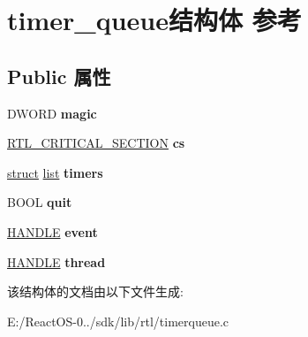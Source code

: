 \hypertarget{structtimer__queue}{}\section{timer\+\_\+queue结构体 参考}
\label{structtimer__queue}
\subsection*{Public 属性}
\begin{DoxyCompactItemize}
\item 
\mbox{\label{structtimer__queue_a9582b5d3e2db4ee2f23240e8dbb1f8ff}} 
D\+W\+O\+RD {\bfseries magic}
\item 
\mbox{\label{structtimer__queue_a01d39587650d02b46ad0f380fa7c8556}} 
\hyperlink{struct___r_t_l___c_r_i_t_i_c_a_l___s_e_c_t_i_o_n}{R\+T\+L\+\_\+\+C\+R\+I\+T\+I\+C\+A\+L\+\_\+\+S\+E\+C\+T\+I\+ON} {\bfseries cs}
\item 
\mbox{\label{structtimer__queue_aebc3c7bc0fabb494e675bae25123bbc4}} 
\hyperlink{interfacestruct}{struct} \hyperlink{classlist}{list} {\bfseries timers}
\item 
\mbox{\label{structtimer__queue_a9d818717bd3d66107c5daf51d48adfb8}} 
B\+O\+OL {\bfseries quit}
\item 
\mbox{\label{structtimer__queue_a01897dcd500704915664fa7f2f7a3e23}} 
\hyperlink{interfacevoid}{H\+A\+N\+D\+LE} {\bfseries event}
\item 
\mbox{\label{structtimer__queue_a3f80726fd82820ea6f91dddc56b0d9ba}} 
\hyperlink{interfacevoid}{H\+A\+N\+D\+LE} {\bfseries thread}
\end{DoxyCompactItemize}


该结构体的文档由以下文件生成\+:\begin{DoxyCompactItemize}
\item 
E\+:/\+React\+O\+S-\/0../sdk/lib/rtl/timerqueue.\+c\end{DoxyCompactItemize}
